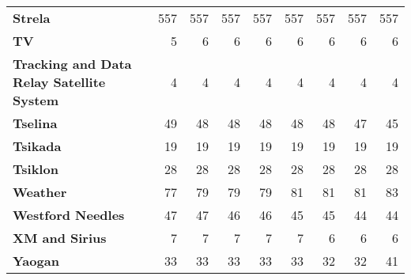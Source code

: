 \begin{table}
\begin{tabular}{lrrrrrrrr}
		\textbf{Strela}                                        & 557            & 557  & 557  & 557  & 557  & 557  & 557  & 557        \\
		\textbf{TV}                                            & 5              & 6    & 6    & 6    & 6    & 6    & 6    & 6          \\
		\textbf{Tracking and Data Relay Satellite System}      & 4              & 4    & 4    & 4    & 4    & 4    & 4    & 4          \\
		\textbf{Tselina}                                       & 49             & 48   & 48   & 48   & 48   & 48   & 47   & 45         \\
		\textbf{Tsikada}                                       & 19             & 19   & 19   & 19   & 19   & 19   & 19   & 19         \\
		\textbf{Tsiklon}                                       & 28             & 28   & 28   & 28   & 28   & 28   & 28   & 28         \\
		\textbf{Weather}                                       & 77             & 79   & 79   & 79   & 81   & 81   & 81   & 83         \\
		\textbf{Westford Needles}                              & 47             & 47   & 46   & 46   & 45   & 45   & 44   & 44         \\
		\textbf{XM and Sirius}                                 & 7              & 7    & 7    & 7    & 7    & 6    & 6    & 6          \\
		\textbf{Yaogan}                                        & 33             & 33   & 33   & 33   & 33   & 32   & 32   & 41         \\
		\bottomrule
	\end{tabular}
\end{table}

